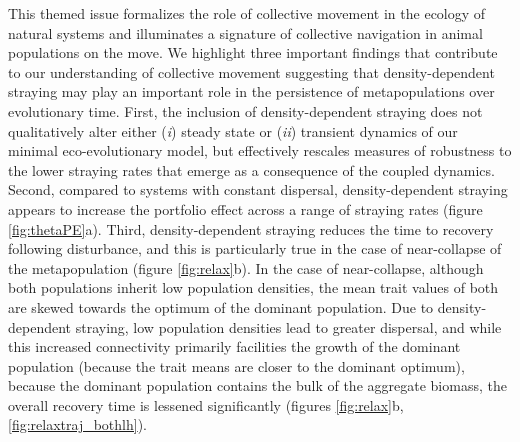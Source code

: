 \documentclass{revtex4}
\begin{document}
This themed issue formalizes the role of collective movement in the ecology of natural systems and illuminates a signature of collective navigation in animal populations on the move.
We highlight three important findings that contribute to our understanding of collective movement suggesting that density-dependent straying may play an important role in the persistence of metapopulations over evolutionary time.
First, the inclusion of density-dependent straying does not qualitatively alter either (\emph{i}) steady state or (\emph{ii}) transient dynamics of our minimal eco-evolutionary model, but effectively rescales measures of robustness to the lower straying rates that emerge as a consequence of the coupled dynamics.
Second, compared to systems with constant dispersal, density-dependent straying appears to increase the portfolio effect across a range of straying rates (figure \ref{fig:thetaPE}a). 
Third, density-dependent straying reduces the time to recovery following disturbance, and this is particularly true in the case of near-collapse of the metapopulation (figure \ref{fig:relax}b).
In the case of near-collapse, although both populations inherit low population densities, the mean trait values of both are skewed towards the optimum of the dominant population.
Due to density-dependent straying, low population densities lead to greater dispersal, and while this increased connectivity primarily facilities the growth of the dominant population (because the trait means are closer to the dominant optimum), because the dominant population contains the bulk of the aggregate biomass, the overall recovery time is lessened significantly (figures \ref{fig:relax}b, \ref{fig:relaxtraj_bothlh}).



\end{document}
